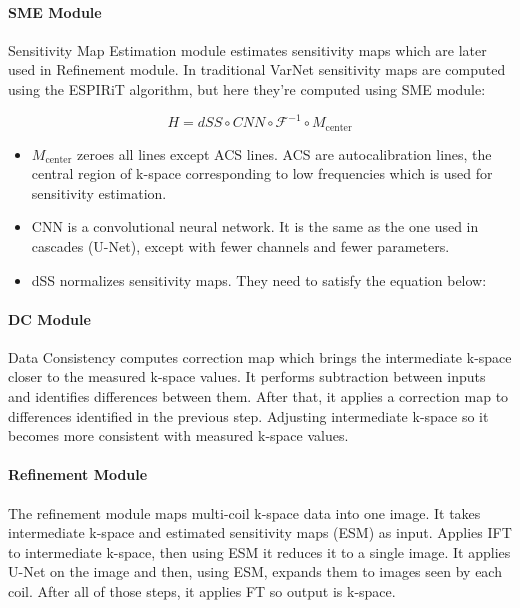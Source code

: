\documentclass[10pt,a4paper]{article}
\begin{document}
\paragraph{SME Module}

Sensitivity Map Estimation module estimates sensitivity maps which are later used in Refinement module. In traditional VarNet sensitivity maps are computed using the ESPIRiT algorithm, but here they're computed using SME module:

$$ H = dSS \circ CNN \circ \mathcal{F}^{-1} \circ M_{\text{center}} $$


\begin{itemize}
  \item $M_{\text{center}}$ zeroes all lines except ACS lines. ACS are autocalibration lines, the central region of k-space corresponding to low frequencies which is used for sensitivity estimation.
  \item CNN is a convolutional neural network. It is the same as the one used in cascades (U-Net), except with fewer channels and fewer parameters.
  \item dSS normalizes sensitivity maps. They need to satisfy the equation below:
\end{itemize}

\paragraph{DC Module}

Data Consistency computes correction map which brings the intermediate k-space closer to the measured k-space values. It performs subtraction between inputs and identifies differences between them. After that, it applies a correction map to differences identified in the previous step. Adjusting intermediate k-space so it becomes more consistent with measured k-space values.

\paragraph{Refinement Module}

The refinement module maps multi-coil k-space data into one image. It takes intermediate k-space and estimated sensitivity maps (ESM) as input. Applies IFT to intermediate k-space, then using ESM it reduces it to a single image. It applies U-Net on the image and then, using ESM, expands them to images seen by each coil. After all of those steps, it applies FT so output is k-space.
\end{document}
